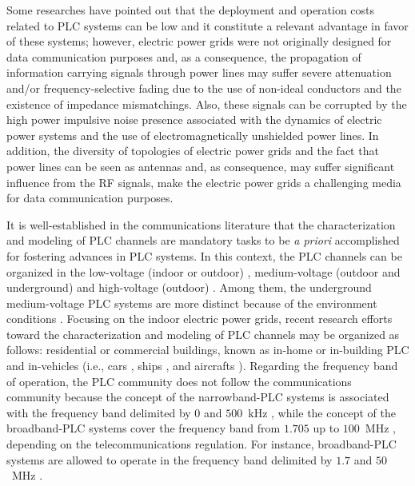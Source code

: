\documentclass[journal]{IEEEtran}
\begin{document}
Some researches have pointed out that the deployment and operation costs related to \ac{PLC} systems can be low \cite{Hrasnica:PLC_design, Dib} and it constitute a relevant advantage in favor of these systems; however, electric power grids were not originally designed for data communication purposes and, as a consequence, the propagation of information carrying signals through power lines may suffer severe attenuation and/or frequency-selective fading due to the use of non-ideal conductors and the existence of impedance mismatchings. Also, these signals can be corrupted by the high power impulsive noise presence associated with the dynamics of electric power systems and the use of electromagnetically unshielded power lines. In addition, the diversity of topologies of electric power grids and the fact that power lines can be seen as antennas and, as consequence, may suffer significant influence from the RF signals, make the electric power grids a challenging media for data communication purposes.  

It is well-established in the communications literature that the characterization and modeling of \ac{PLC} channels are mandatory tasks to be \textit{a priori} accomplished for fostering advances in \ac{PLC} systems. In this context, the \ac{PLC} channels can be organized in the low-voltage (indoor or outdoor) \cite{Zhai:low}, medium-voltage (outdoor and underground) \cite{Lazaropoulos} and high-voltage (outdoor) \cite{Zajc}. Among them, the underground medium-voltage \ac{PLC} systems are more distinct because of the environment conditions \cite{Aquilue}. Focusing on the indoor electric power grids, recent research efforts toward the characterization and modeling of \ac{PLC} channels may be organized as follows: residential or commercial buildings, known as in-home or in-building \ac{PLC} \cite{Amirshahi:PLC,Tlich:Indoor} and in-vehicles (i.e., cars \cite{Vallejo:Vehicle_PLC}, ships \cite{Barmada:Ships_PLC}, and aircrafts \cite{Jones:Aircraft_PLC}). Regarding the frequency band of operation, the \ac{PLC} community does not follow the communications community because the concept of the narrowband-\ac{PLC} systems is associated with the frequency band delimited by $0$ and $500$~kHz \cite{Gassara:Charac_PLC,Chrysochos:MIMO_OFDM}, while the concept of the broadband-\ac{PLC} systems cover the frequency band from $1.705$ up to $100$~MHz \cite{Tlich:Indoor,Galli:Wireline}, depending on the telecommunications regulation. For instance, broadband-\ac{PLC} systems are allowed to operate in the frequency band delimited by $1.7$ and $50$~MHz \cite{Anatel:PLC}.
\end{document}
